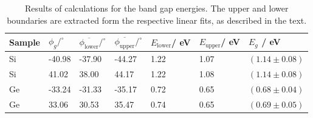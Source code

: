 \renewcommand{\arraystretch}{1.5}
\begin{table}[htdp]
    \centering
    \caption{Results of calculations for the band gap energies. The upper and lower boundaries 
        are extracted form the respective linear fits, as described in the text. }
	\begin{tabular}{|p{1.5cm}|p{1.5cm}|p{1.5cm}|p{1.5cm}|p{2cm}|p{2cm}|p{2.7cm}|}
		\hline
		\rowcolor{tabcolor}
		Sample & $\phi_g / ^\circ$ & 
 			$\overline{\phi_\mathrm{lower}}/ ^\circ$  & $\overline{\phi_\mathrm{upper}}/ ^\circ$  &
 			$E_\mathrm{lower}$/ eV & $E_\mathrm{upper}$/ eV  &  $E_g$ / eV \\ \hline
		Si & -40.98 & -37.90 & -44.27  & 1.22 & 1.07 & $(1.14 \pm 0.08)$\\ 
		Si & 41.02 & 38.00 & 44.17  & 1.22 & 1.08 & $(1.14 \pm 0.08)$\\ 
		Ge & -33.24 & -31.33 & -35.17  & 0.72 & 0.65 & $(0.68 \pm 0.04)$\\ 
		Ge & 33.06 & 30.53 & 35.47  & 0.74 & 0.65 & $(0.69 \pm 0.05)$\\ 
		\hline
	\end{tabular}
    \label{tab:band_gap_results}
\end{table}

